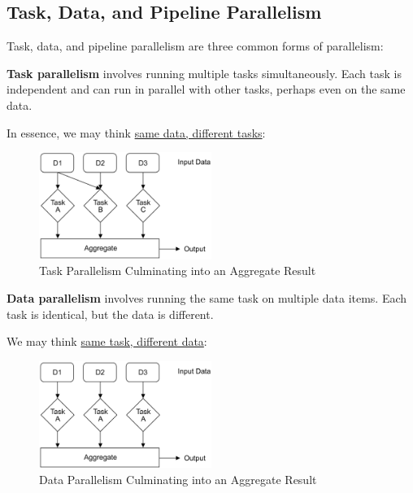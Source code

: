 \newpage 

\subsection{Task, Data, and Pipeline Parallelism}

Task, data, and pipeline parallelism are three common forms of parallelism:

\begin{Def}

    \textbf{Task parallelism} involves running multiple tasks simultaneously. Each task is independent and can run in parallel with other tasks,
    perhaps even on the same data.
\end{Def}
\noindent
In essence, we may think \underline{same data, different tasks}:
\begin{figure}[h]
    \centering
    \includegraphics[width=0.5\textwidth]{./Sections/rpc_2/tpar.png}
    \caption{Task Parallelism Culminating into an Aggregate Result}
\end{figure}
\noindent

\vspace{-1em}
\begin{Def}

    \textbf{Data parallelism} involves running the same task on multiple data items. Each task is identical, but the data is different.
\end{Def}
\noindent
We may think \underline{same task, different data}:
\begin{figure}[h]
    \centering
    \includegraphics[width=0.5\textwidth]{./Sections/rpc_2/dpar.png}
    \caption{Data Parallelism Culminating into an Aggregate Result}
\end{figure}

